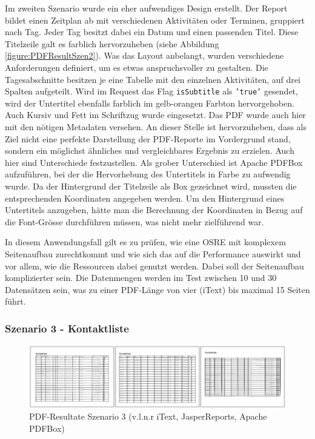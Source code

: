 \documentclass[main.tex]{subfiles}
\begin{document}
Im zweiten Szenario wurde ein eher aufwendiges Design erstellt. Der Report bildet einen Zeitplan ab mit verschiedenen Aktivitäten oder Terminen, gruppiert nach Tag. Jeder Tag besitzt dabei ein Datum und einen passenden Titel. Diese Titelzeile galt es farblich hervorzuheben (siehe Abbildung \ref{figure:PDFResultSzen2}). Was das Layout anbelangt, wurden verschiedene Anforderungen definiert, um es etwas anspruchsvoller zu gestalten. Die Tagesabschnitte besitzen je eine Tabelle mit den einzelnen Aktivitäten, auf drei Spalten aufgeteilt. Wird im Request das Flag \texttt{isSubtitle} als \texttt{'true'} gesendet, wird der Untertitel ebenfalls farblich im gelb-orangen Farbton hervorgehoben. Auch Kursiv und Fett im Schriftzug wurde eingesetzt. Das PDF wurde auch hier mit den nötigen Metadaten versehen. An dieser Stelle ist hervorzuheben, dass als Ziel nicht eine perfekte Darstellung der PDF-Reporte im Vordergrund stand, sondern ein möglichst ähnliches und vergleichbares Ergebnis zu erzielen. Auch hier sind Unterschiede festzustellen. Als grober Unterschied ist Apache PDFBox aufzuführen, bei der die Hervorhebung des Untertitels in Farbe zu aufwendig wurde. Da der Hintergrund der Titelzeile als Box gezeichnet wird, mussten die entsprechenden Koordinaten angegeben werden. Um den Hintergrund eines Untertitels anzugeben, hätte man die Berechnung der Koordinaten in Bezug auf die Font-Grösse durchführen müssen, was nicht mehr zielführend war.

In diesem Anwendungsfall gilt es zu prüfen, wie eine OSRE mit komplexem Seitenaufbau zurechtkommt und wie sich das auf die Performance auswirkt und vor allem, wie die Ressourcen dabei genutzt werden. Dabei soll der Seitenaufbau komplizierter sein. Die Datenmengen werden im Test zwischen 10 und 30 Datensätzen sein, was zu einer PDF-Länge von vier (iText) bis maximal 15 Seiten führt.

\subsubsection{Szenario 3 - Kontaktliste}

\begin{figure}[h]
\includegraphics[width=\textwidth]{mainpart/3_methodik_evaluation_img/Szenario3PDF.PNG}
 \caption{PDF-Resultate Szenario 3 (v.l.n.r iText, JasperReports, Apache PDFBox)}
 \label{figure:PDFResultSzen3}
\end{figure}
\end{document}
